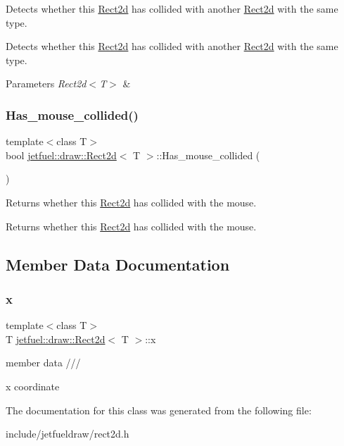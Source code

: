 Detects whether this \hyperlink{classjetfuel_1_1draw_1_1Rect2d}{Rect2d} has collided with another \hyperlink{classjetfuel_1_1draw_1_1Rect2d}{Rect2d} with the same type. 

Detects whether this \hyperlink{classjetfuel_1_1draw_1_1Rect2d}{Rect2d} has collided with another \hyperlink{classjetfuel_1_1draw_1_1Rect2d}{Rect2d} with the same type.


\begin{DoxyParams}{Parameters}
{\em Rect2d$<$\+T$>$} & \\
\hline
\end{DoxyParams}
\mbox{\label{classjetfuel_1_1draw_1_1Rect2d_affa3a06a40154e71485b9676710f6d0d}} 
\subsubsection{\texorpdfstring{Has\+\_\+mouse\+\_\+collided()}{Has\_mouse\_collided()}}
{\footnotesize\ttfamily template$<$class T$>$ \\
bool \hyperlink{classjetfuel_1_1draw_1_1Rect2d}{jetfuel\+::draw\+::\+Rect2d}$<$ T $>$\+::Has\+\_\+mouse\+\_\+collided (\begin{DoxyParamCaption}{ }\end{DoxyParamCaption})\hspace{0.3cm}{\ttfamily [inline]}}



Returns whether this \hyperlink{classjetfuel_1_1draw_1_1Rect2d}{Rect2d} has collided with the mouse. 

Returns whether this \hyperlink{classjetfuel_1_1draw_1_1Rect2d}{Rect2d} has collided with the mouse. 

\subsection{Member Data Documentation}
\mbox{\label{classjetfuel_1_1draw_1_1Rect2d_ade151e450d1cc5e7b158a28e7bd6d212}} 
\subsubsection{\texorpdfstring{x}{x}}
{\footnotesize\ttfamily template$<$class T$>$ \\
T \hyperlink{classjetfuel_1_1draw_1_1Rect2d}{jetfuel\+::draw\+::\+Rect2d}$<$ T $>$\+::x}



member data /// 

x coordinate 

The documentation for this class was generated from the following file\+:\begin{DoxyCompactItemize}
\item 
include/jetfueldraw/rect2d.\+h\end{DoxyCompactItemize}
